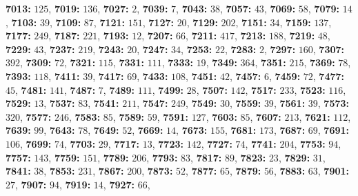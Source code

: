 \textsf{\bfseries 7013:} $125$, \textsf{\bfseries 7019:} $136$, \textsf{\bfseries 7027:} $2$, \textsf{\bfseries 7039:} $7$, \textsf{\bfseries 7043:} $38$, \textsf{\bfseries 7057:} $43$, \textsf{\bfseries 7069:} $58$, \textsf{\bfseries 7079:} $14$, \textsf{\bfseries 7103:} $39$, \textsf{\bfseries 7109:} $87$, \textsf{\bfseries 7121:} $151$, \textsf{\bfseries 7127:} $20$, \textsf{\bfseries 7129:} $202$, \textsf{\bfseries 7151:} $34$, \textsf{\bfseries 7159:} $137$, \textsf{\bfseries 7177:} $249$, \textsf{\bfseries 7187:} $221$, \textsf{\bfseries 7193:} $12$, \textsf{\bfseries 7207:} $66$, \textsf{\bfseries 7211:} $417$, \textsf{\bfseries 7213:} $188$, \textsf{\bfseries 7219:} $48$, \textsf{\bfseries 7229:} $43$, \textsf{\bfseries 7237:} $219$, \textsf{\bfseries 7243:} $20$, \textsf{\bfseries 7247:} $34$, \textsf{\bfseries 7253:} $22$, \textsf{\bfseries 7283:} $2$, \textsf{\bfseries 7297:} $160$, \textsf{\bfseries 7307:} $392$, \textsf{\bfseries 7309:} $72$, \textsf{\bfseries 7321:} $115$, \textsf{\bfseries 7331:} $111$, \textsf{\bfseries 7333:} $19$, \textsf{\bfseries 7349:} $364$, \textsf{\bfseries 7351:} $215$, \textsf{\bfseries 7369:} $78$, \textsf{\bfseries 7393:} $118$, \textsf{\bfseries 7411:} $39$, \textsf{\bfseries 7417:} $69$, \textsf{\bfseries 7433:} $108$, \textsf{\bfseries 7451:} $42$, \textsf{\bfseries 7457:} $6$, \textsf{\bfseries 7459:} $72$, \textsf{\bfseries 7477:} $45$, \textsf{\bfseries 7481:} $141$, \textsf{\bfseries 7487:} $7$, \textsf{\bfseries 7489:} $111$, \textsf{\bfseries 7499:} $28$, \textsf{\bfseries 7507:} $142$, \textsf{\bfseries 7517:} $233$, \textsf{\bfseries 7523:} $116$, \textsf{\bfseries 7529:} $13$, \textsf{\bfseries 7537:} $83$, \textsf{\bfseries 7541:} $211$, \textsf{\bfseries 7547:} $249$, \textsf{\bfseries 7549:} $30$, \textsf{\bfseries 7559:} $39$, \textsf{\bfseries 7561:} $39$, \textsf{\bfseries 7573:} $320$, \textsf{\bfseries 7577:} $246$, \textsf{\bfseries 7583:} $85$, \textsf{\bfseries 7589:} $59$, \textsf{\bfseries 7591:} $127$, \textsf{\bfseries 7603:} $85$, \textsf{\bfseries 7607:} $213$, \textsf{\bfseries 7621:} $112$, \textsf{\bfseries 7639:} $99$, \textsf{\bfseries 7643:} $78$, \textsf{\bfseries 7649:} $52$, \textsf{\bfseries 7669:} $14$, \textsf{\bfseries 7673:} $155$, \textsf{\bfseries 7681:} $173$, \textsf{\bfseries 7687:} $69$, \textsf{\bfseries 7691:} $106$, \textsf{\bfseries 7699:} $74$, \textsf{\bfseries 7703:} $29$, \textsf{\bfseries 7717:} $13$, \textsf{\bfseries 7723:} $142$, \textsf{\bfseries 7727:} $74$, \textsf{\bfseries 7741:} $204$, \textsf{\bfseries 7753:} $94$, \textsf{\bfseries 7757:} $143$, \textsf{\bfseries 7759:} $151$, \textsf{\bfseries 7789:} $206$, \textsf{\bfseries 7793:} $83$, \textsf{\bfseries 7817:} $89$, \textsf{\bfseries 7823:} $23$, \textsf{\bfseries 7829:} $31$, \textsf{\bfseries 7841:} $38$, \textsf{\bfseries 7853:} $231$, \textsf{\bfseries 7867:} $200$, \textsf{\bfseries 7873:} $52$, \textsf{\bfseries 7877:} $65$, \textsf{\bfseries 7879:} $56$, \textsf{\bfseries 7883:} $63$, \textsf{\bfseries 7901:} $27$, \textsf{\bfseries 7907:} $94$, \textsf{\bfseries 7919:} $14$, \textsf{\bfseries 7927:} $66$, 
